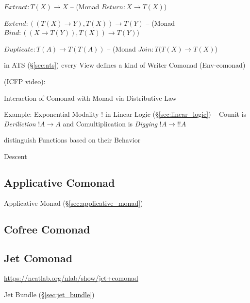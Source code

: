 $Extract : T(X) \rightarrow X$ -- (Monad $Return : X \rightarrow
T(X)$)

$Extend : ((T(X) \rightarrow Y), T(X)) \rightarrow T(Y)$ -- (Monad
$Bind : ((X \rightarrow T(Y)), T(X)) \rightarrow T(Y)$)

$Duplicate : T(A) \rightarrow T(T(A))$ -- (Monad
$Join : T(T(X) \rightarrow T(X)$)

in ATS (\S\ref{sec:ats}) every View defines a kind of Writer Comonad
(Env-comonad)


\asterism


(ICFP video):

Interaction of Comonad with Monad via Distributive Law %

Example: Exponential Modality $!$ in Linear Logic
(\S\ref{sec:linear_logic}) -- Counit is \emph{Deriliction} $!A
\rightarrow A$ and Comultiplication is \emph{Digging} $!A \rightarrow
!!A$

distinguish Functions based on their Behavior

Descent



\subsection{Applicative Comonad}\label{sec:applicative_comonad}

Applicative Monad (\S\ref{sec:applicative_monad})



\subsection{Cofree Comonad}\label{sec:cofree_comonad}

\subsection{Jet Comonad}\label{sec:jet_comonad}

\url{https://ncatlab.org/nlab/show/jet+comonad}

\fist Jet Bundle (\S\ref{sec:jet_bundle})



